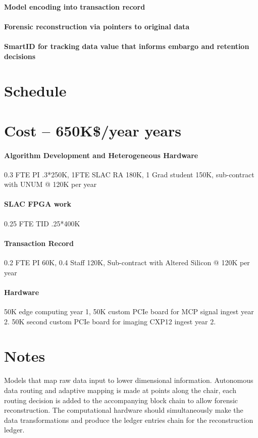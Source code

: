 \documentclass{article}
\begin{document}
\paragraph{Model encoding into transaction record}
\paragraph{Forensic reconstruction via pointers to original data}
\paragraph{SmartID for tracking data value that informs embargo and retention decisions}

\section{Schedule}

\section{Cost -- 650K\$/year  years}
\paragraph{Algorithm Development and Heterogeneous Hardware} 0.3 FTE PI .3*250K, 1FTE SLAC RA 180K, 1 Grad student 150K, sub-contract with UNUM @ 120K per year
\paragraph{SLAC FPGA work} 0.25 FTE TID .25*400K
\paragraph{Transaction Record} 0.2 FTE PI 60K, 0.4 Staff 120K, Sub-contract with Altered Silicon @ 120K per year
\paragraph{Hardware} 50K edge computing year 1, 50K custom PCIe board for MCP signal ingest year 2.  50K second custom PCIe board for imaging CXP12 ingest year 2.

\pagebreak
\section{Notes}

Models that map raw data input to lower dimensional information. Autonomous data routing and adaptive mapping is made at points along the chair, each routing decision is added to the accompanying block chain to allow forensic reconstruction. The computational hardware should simultaneously make the data transformations and produce the ledger entries chain for the reconstruction ledger.
\end{document}
